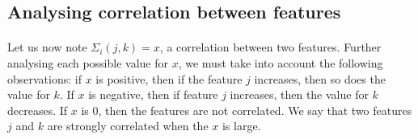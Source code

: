 \subsection{Analysing correlation between features}
\paragraph{}
Let us now note ${\Sigma}_i(j, k) = x$, a correlation between two features.
Further analysing each possible value for $x$, we must take into account the following observations: if $x$ is positive, then if the feature $j$ increases, then so does the value for $k$.
If $x$ is negative, then if feature $j$ increases, then the value for $k$ decreases.
If $x$ is 0, then the features are not correlated.
We say that two features $j$ and $k$ are strongly correlated when the $x$ is large.